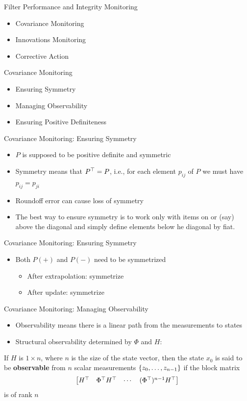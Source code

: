 \begin{frame}
Filter Performance and Integrity Monitoring
 \begin{itemize}
 \item Covariance Monitoring
 \item Innovations Monitoring
 \item Corrective Action
\end{itemize}
\end{frame}
\begin{frame}
Covariance Monitoring
\begin{itemize}
  \item Ensuring Symmetry
  \item Managing Observability
  \item Ensuring Positive Definiteness
\end{itemize} 
\end{frame}
\begin{frame}
Covariance Monitoring:  Ensuring Symmetry
\begin{itemize}
  \item $P$ is supposed to be positive definite and symmetric
  \item Symmetry means that $P^\top = P$, i.e., for each element $p_{ij}$ of $P$ we must have $p_{ij}=p_{ji}$
  \item Roundoff error can cause loss of symmetry
  \item The best way to ensure symmetry is to work only with items on or (say) above the diagonal and simply define elements below he diagonal by fiat.
\end{itemize} 
\end{frame}
\begin{frame}
Covariance Monitoring:  Ensuring Symmetry
\begin{itemize}
  \item Both $P(+)$ and $P(-)$ need to be symmetrized
\begin{itemize}
  \item After extrapolation: symmetrize
  \item After update: symmetrize
\end{itemize}
\end{itemize} 
\end{frame}
\begin{frame}
Covariance Monitoring:  Managing Observability
\begin{itemize}
  \item Observability means there is a linear path from the measurements to states
  \item Structural observability determined by $\Phi$ and $H$:
\end{itemize}
 If $H$ is $1\times n$, where $n$ is the size of the state vector, then the state $x_0$ is said to be \textbf{observable }from $n$ scalar measurements $\left\{z_0,\ldots,z_{n-1}\right\}$ if the block matrix
\[
\begin{bmatrix}
H^\top&\Phi^\top H^\top & \cdots & (\Phi^\top)^{n-1}H^\top
\end{bmatrix}
\]
is of rank $n$
\end{frame}
